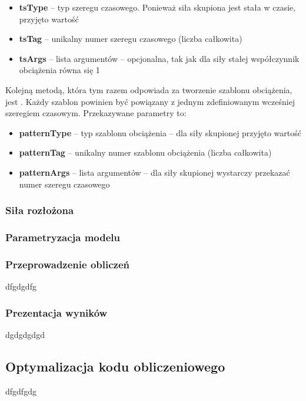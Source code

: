 \begin{itemize}
    \item \textbf{tsType} – typ szeregu czasowego. Ponieważ siła skupiona jest stała w czasie, przyjęto wartość 
    \item \textbf{tsTag} – unikalny numer szeregu czasowego (liczba całkowita)
    \item \textbf{tsArgs} – lista argumentów – opcjonalna, tak jak dla siły stałej współczynnik obciążenia równa się 1
\end{itemize}

Kolejną metodą, która tym razem odpowiada za tworzenie szablonu obciążenia, jest .
Każdy szablon powinien być powiązany z jednym zdefiniowanym wcześniej szeregiem czasowym.
Przekazywane parametry to:

\begin{itemize}
    \item \textbf{patternType} – typ szablonu obciążenia – dla siły skupionej przyjęto wartość 
    \item \textbf{patternTag} – unikalny numer szablonu obciążenia (liczba całkowita)
    \item \textbf{patternArgs} – lista argumentów – dla siły skupionej wystarczy przekazać numer szeregu czasowego
\end{itemize}

\subsubsection*{Siła rozłożona}

\subsubsection{Parametryzacja modelu}

\subsubsection{Przeprowadzenie obliczeń}

dfgdgdfg

\subsubsection{Prezentacja wyników}

dgdgdgdgd

\subsection{Optymalizacja kodu obliczeniowego}

dfgdfgdg
